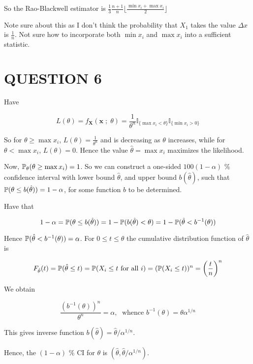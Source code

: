 \documentclass[a4paper]{article}
\begin{document}
So the Rao-Blackwell estimator is $ \frac{1}{3} \frac{n+1}{n}  \lfloor  \frac{\min x_{i} + \max x_{i}}{2}  \rfloor $

Note sure about this as I don't think the probability that $ X_{1} $ takes the value $ \Delta x $ is $ \frac{1}{n} $. Not sure how to incorporate both $ \min x_{i} $ and $ \max x_{i} $ into a sufficient statistic.  
 


\section{QUESTION 6}

Have

\[ L(\theta) = f_{\mathbf{X}} (\mathbf{x} \; ; \; \theta) = \frac{1}{\theta^{n}} \mathbb{I}_{\{  \max x_{i} < \theta \}} \mathbb{I}_{\{  \min x_{i} > 0 \}} \]

So for $ \theta \geq \max x_{i} $, $ L(\theta) = \frac{1}{\theta^{n}} $ and is decreasing as $ \theta $ increases, while for $ \theta < \max x_{i} $, $ L(\theta) = 0 $. Hence the value $ \hat{\theta} = \max x_{i} $ maximizes the likelihood.

Now, $ \P_{\theta}(\theta \geq \max x_{i}) = 1 $. So we can construct a one-sided $ 100(1-\alpha) $ \% confidence interval with lower bound $ \hat{\theta} $, and upper bound $ b(\hat{\theta}) $, such that $ \P(\theta \leq b(\hat{\theta})) = 1 - \alpha $, for some function $ b $ to be determined.

Have that 

\[ 1 - \alpha = \P (\theta \leq b(\hat{\theta})) = 1 - \P(b(\hat{\theta}) < \theta) = 1 - \P(\hat{\theta} < b^{-1}(\theta))  \]

Hence $ \P(\hat{\theta} < b^{-1}(\theta)) = \alpha  $. For $ 0 \leq t \leq \theta $ the cumulative distribution function of $ \hat{\theta}  $ is

\[ F_{\hat{\theta}}(t) = \P (\hat{\theta} \leq t) = \P ( X_{i} \leq t \text{ for all } i) = ( \P(X_{i}\leq t))^{n} = \left( \frac{t}{n} \right)^{n}  \]

We obtain

\[ \frac{(b^{-1}(\theta))^{n}}{\theta^{n}} = \alpha, \; \text{ whence } b^{-1}(\theta) = \theta \alpha^{1/n} \]

This gives inverse function $ b(\hat{\theta}) = \hat{\theta} / \alpha^{1/n} $.

Hence, the $ (1 - \alpha) $ \% CI for $ \theta $ is $ (\hat{\theta},\hat{\theta}/\alpha^{1/n}) $.
\end{document}

